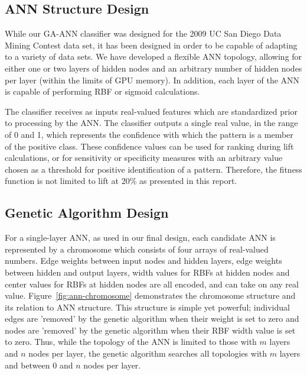 \documentclass[11pt]{article}       %
\begin{document}
\subsection{ANN Structure Design} \label{ann}

While our GA-ANN classifier was designed for the 2009 UC San Diego Data Mining Contest data set, it has been designed in order to be capable of adapting to a variety of data sets.  We have developed a flexible ANN topology, allowing for either one or two layers of hidden nodes and an arbitrary number of hidden nodes per layer (within the limits of GPU memory). In addition, each layer of the ANN is capable of performing RBF or sigmoid calculations.

The classifier receives as inputs real-valued features which are standardized prior to processing by the ANN.  The classifier outputs a single real value, in the range of 0 and 1, which represents the confidence with which the pattern is a member of the positive class.  These confidence values can be used for ranking during lift calculations, or for sensitivity or specificity measures with an arbitrary value chosen as a threshold for positive identification of a pattern.  Therefore, the fitness function is not limited to lift at 20\% as presented in this report.

\subsection{Genetic Algorithm Design} \label{ann}

For a single-layer ANN, as used in our final design, each candidate ANN is represented by a chromosome which consists of four arrays of real-valued numbers. Edge weights between input nodes and hidden layers, edge weights between hidden and output layers, width values for RBFs at hidden nodes and center values for RBFs at hidden nodes are all encoded, and can take on any real value. Figure~\ref{fig:ann-chromosome} demonstrates the chromosome structure and its relation to ANN structure.  This structure is simple yet powerful; individual edges are 'removed' by the genetic algorithm when their weight is set to zero and nodes are 'removed' by the genetic algorithm when their RBF width value is set to zero.  Thus, while the topology of the ANN is limited to those with $m$ layers and $n$ nodes per layer, the genetic algorithm searches all topologies with $m$ layers and between 0 and $n$ nodes per layer.
\end{document}

